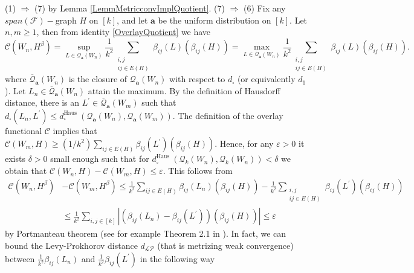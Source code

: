 \documentclass[11pt]{article}
\newcommand{\cF}{{\mathcal F}}  %
\begin{document}
(1) $\Rightarrow$ (7) by Lemma \ref{LemmMetricconvImplQuotient}. \newline
(7) $\Rightarrow$ (6) Fix any $span(\cF)-$graph $H$ on $[k]$, and let $\mathbf{a}$ be the uniform distribution on $[k]$. Let $n, m \geq 1$, then from identity \eqref{OverlayQuotient} we have
$$
\mathcal{C}\left(W_n, H^{\beta}\right)=\sup _{L \in \mathcal{Q}_{\mathbf{a}}\left(W_n\right)} \frac{1}{k^2} \sum_{\substack{i, j \\ i j \in E(H)}} \beta_{i j}(L)(\beta_{i j}(H))=\max _{L \in \overline{\mathcal{Q}}_{\mathbf{a}}\left(W_n\right)} \frac{1}{k^2} \sum_{\substack{i, j \\ i j \in E(H)}} \beta_{i j}(L)(\beta_{i j}(H)) .
$$
where $\overline{\mathcal{Q}}_{\mathbf{a}}\left(W_n\right)$ is the closure of ${\mathcal{Q}}_{\mathbf{a}}\left(W_n\right)$ with respect to $d_{\square}$ (or equivalently $d_1$).
Let $L_n \in \overline{\mathcal{Q}}_{\mathbf{a}}\left(W_n\right)$ attain the maximum. By the definition of Hausdorff distance, there is an $L^{\prime} \in \overline{\mathcal{Q}}_{\mathbf{a}}\left(W_m\right)$ such that $d_{\square}\left(L_n, L^{\prime}\right) \leq d_{\square}^{\text {Haus }}\left(\mathcal{Q}_{\mathbf{a}}\left(W_n\right), \mathcal{Q}_{\mathbf{a}}\left(W_m\right)\right)$. The definition of the overlay functional $\mathcal{C}$ implies that $\mathcal{C}\left(W_m, H\right) \geq\left(1 / k^2\right) \sum_{i j \in E(H)} \beta_{i j}\left(L^{\prime}\right)(\beta_{i j}(H))$. Hence, for any $\varepsilon>0$ it exists $\delta>0$ small enough such that for $d_{\square}^{\text {Haus }}\left(\mathcal{Q}_k\left(W_n\right), \mathcal{Q}_k\left(W_n\right)\right)<\delta$ we obtain that $\mathcal{C}\left(W_n, H\right)  -\mathcal{C}\left(W_m, H\right)\leq \varepsilon $. This follows from 
$$
\begin{aligned}
\mathcal{C}\left(W_n, H^{\beta}\right) & -\mathcal{C}\left(W_m, H^{\beta}\right) \leq \frac{1}{k^2} \sum_{i j \in E(H)} \beta_{i j}\left(L_n\right)(\beta_{i j}(H))-\frac{1}{k^2} \sum_{\substack{i, j \\
i j \in E(H)}} \beta_{i j}\left(L^{\prime}\right)(\beta_{i j}(H)) \\
& \leq \frac{1}{k^2} \sum_{i, j\in [k]}\left|(\beta_{i j}\left(L_n\right)-\beta_{i j}\left(L^{\prime}\right))(\beta_{i j}(H))\right|\leq \varepsilon
\end{aligned}$$
by Portmanteau theorem (see for example Theorem 2.1 in \cite{billingsley1968convergence}). In fact, we can bound the Levy-Prokhorov distance $d_{\mathcal{LP}}$ (that is metrizing weak convergence) between $\frac{1}{k^2}\beta_{ij}(L_n)$ and $\frac{1}{k^2}\beta_{ij}(L^{\prime})$ in the following way 
\end{document}
